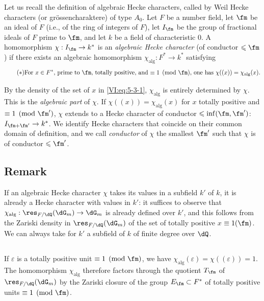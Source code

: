 Let us recall the definition of algebraic Hecke characters, called by Weil 
Hecke characters (or gr\"ossencharaktere) of type $A_0$. Let $F$ be 
a number field, let $\fm$ be an ideal of $F$ (i.e., of the ring of integers of 
$F$), let $I_\fm$ be the group of fractional ideals of $F$ prime to $\fm$, 
and let $k$ be a field of characteristic $0$. A homomorphism 
$\chi:I_\fm \to k^\ast$ is an \emph{algebraic Hecke character} (of 
conductor $\leqslant \fm$) if there exists an algebraic homomorphism 
$\chi_\text{alg}:F^\ast \to k^\ast$ satisfying 
\begin{equation*}\tag{$*$}\label{VI:eq:5-3-1}
\text{For $x\in F^\ast$, prime to $\fm$, totally positive, and 
$\equiv 1\pmod\fm$, one has $\chi((x))=\chi_\text{alg}(x)$.}
\end{equation*}

By the density of the set of $x$ in \eqref{VI:eq:5-3-1}, $\chi_\text{alg}$ 
is entirely determined by $\chi$. This is the \emph{algebraic part} 
of $\chi$. If $\chi((x))=\chi_\text{alg}(x)$ for $x$ totally positive and 
$\equiv 1\pmod{\fm'}$, $\chi$ extends to a Hecke character of 
conductor $\leqslant \inf(\fm,\fm')$: $I_{\fm+\fm'}\to k^\ast$. We 
identify Hecke characters that coincide on their common domain of 
definition, and we call \emph{conductor} of $\chi$ the smallest $\fm'$ 
such that $\chi$ is of conductor $\leqslant \fm'$. 






\subsection{Remark}\label{VI:5-4}

If an algebraic Hecke character $\chi$ takes its values in a 
subfield $k'$ of $k$, it is already a Hecke character with values in 
$k'$: it suffices to observe that $\chi_\text{alg}:\res_{F/\dQ}(\dG_m) \to \dG_m$ 
is already defined over $k'$, and this follows from the Zariski density 
in $\res_{F/\dQ}(\dG_m)$ of the set of totally positive $x$ 
$\equiv 1(\fm)$. We can always take for $k'$ a subfield of $k$ of 
finite degree over $\dQ$. 





\subsection{}\label{VI:5-5}

If $\varepsilon$ is a totally positive unit $\equiv 1\pmod\fm$, we have 
$\chi_\text{alg}(\varepsilon) = \chi((\varepsilon)) = 1$. The homomorphism 
$\chi_\text{alg}$ therefore factors through the quotient $T_\fm$ of 
$\res_{F/\dQ}(\dG_m)$ by the Zariski closure of the group 
$E_\fm\subset F^\ast$ of totally positive units $\equiv 1\pmod\fm$. 


